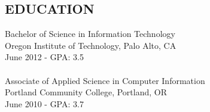 \documentclass[line, margin]{res}
\begin{document}
\begin{resume}
\section{EDUCATION} 
Bachelor of Science in Information Technology \\
Oregon Institute of Technology, Palo Alto, CA \\
June 2012 - GPA: 3.5 \\
\\
Associate of Applied Science in Computer Information \\
Portland Community College, Portland, OR \\
June 2010 - GPA: 3.7

\end{resume}
\end{document}
